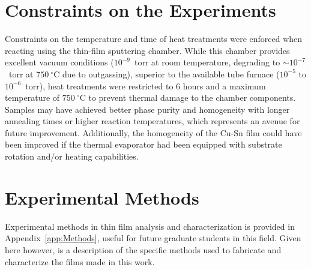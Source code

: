 

\section{Constraints on the Experiments}

Constraints on the temperature and time of heat treatments were enforced when reacting using the thin-film sputtering chamber. While this chamber provides excellent vacuum conditions ($10^{-9}$~torr at room temperature, degrading to $\sim10^{-7}$~torr at $750~^\circ$C due to outgassing), superior to the available tube furnace ($10^{-5}$ to $10^{-6}$~torr), heat treatments were restricted to 6 hours and a maximum temperature of $750~^\circ$C to prevent thermal damage to the chamber components. Samples may have achieved better phase purity and homogeneity with longer annealing times or higher reaction temperatures, which represents an avenue for future improvement. Additionally, the homogeneity of the Cu-Sn film could have been improved if the thermal evaporator had been equipped with substrate rotation and/or heating capabilities.

\section{Experimental Methods}

Experimental methods in thin film analysis and characterization is provided in Appendix~\ref{app:Methods}, useful for future graduate students in this field. Given here however, is a description of the specific methods used to fabricate and characterize the films made in this work.

